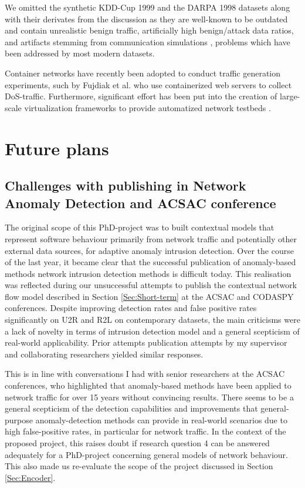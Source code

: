 \documentclass[a4paper,12pt,twoside]{article}
\begin{document}
We omitted the synthetic KDD-Cup 1999 and the DARPA 1998 datasets along with their derivates from the discussion as they are well-known to be outdated and contain unrealistic benign traffic, artificially high benign/attack data ratios, and artifacts stemming from communication simulations \cite{tavallaee2009detailed,mchugh2000testing}, problems which have been addressed by most modern datasets.

Container networks have recently been adopted to conduct traffic generation experiments, such by Fujdiak et al. \cite{fujdiak2018ip} who use containerized web servers to collect DoS-traffic. Furthermore, significant effort has been put into the creation of large-scale virtualization frameworks to provide automatized network testbeds \cite{crussell2015minimega, badiger2018violet}.


\section{Future plans}

\subsection{Challenges with publishing in Network Anomaly Detection and ACSAC conference}\label{Sec:Problems}

The original scope of this PhD-project was to built contextual models that represent software behaviour primarily from network traffic and potentially other external data sources, for adaptive anomaly intrusion detection.  
Over the course of the last year, it became clear that the successful publication of anomaly-based methods network intrusion detection methods is difficult today. This realisation was reflected during our unsuccessful attempts to publish the contextual network flow model described in Section \ref{Sec:Short-term} at the ACSAC and CODASPY conferences. Despite improving detection rates and false positive rates significantly on U2R and R2L on contemporary datasets, the main criticisms were a lack of novelty in terms of intrusion detection model and a general scepticism of real-world applicability. Prior attempts publication attempts by my supervisor and collaborating researchers yielded similar responses.

This is in line with conversations I had with senior researchers at the ACSAC conferences, who highlighted that anomaly-based methods have been applied to network traffic for over 15 years without convincing results. There seems to be a general scepticism of the detection capabilities and improvements that general-purpose anomaly-detection methods can provide in real-world scenarios due to high false-positive rates, in particular for network traffic. In the context of the proposed project, this raises doubt if research question 4 can be answered adequately for a PhD-project concerning general models of network behaviour. This also made us re-evaluate the scope of the project discussed in Section \ref{Sec:Encoder}.
\end{document}
